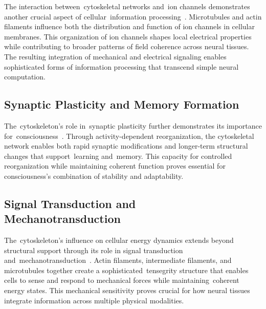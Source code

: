 The interaction between~cytoskeletal networks and~ion channels demonstrates another crucial aspect of cellular~information processing~\cite{pinotsis2023cytoelectric, hunt2024electromagnetic}. Microtubules and actin filaments influence both the distribution and function of ion channels in cellular membranes. This organization of ion channels shapes local electrical properties while contributing to broader patterns of field coherence across neural tissues. The resulting integration of mechanical and electrical signaling enables sophisticated forms of information processing that transcend simple neural computation.

\subsection*{Synaptic Plasticity and Memory Formation~~}

The~cytoskeleton's role in~synaptic plasticity further demonstrates its importance for~consciousness~\cite{Kapitein2015, Choquet2013}. Through activity-dependent reorganization, the cytoskeletal network enables both rapid synaptic modifications and longer-term structural changes that support~learning and~memory. This capacity for controlled reorganization while maintaining coherent function proves essential for consciousness's combination of stability and adaptability.

\subsection*{Signal Transduction and Mechanotransduction~~}

The~cytoskeleton's influence on cellular energy dynamics extends beyond structural support through its role in signal transduction and~mechanotransduction~\cite{Fletcher2010, pinotsis2023cytoelectric}. Actin filaments, intermediate filaments, and microtubules together create a sophisticated~tensegrity structure that enables cells to sense and respond to mechanical forces while maintaining~coherent energy states. This mechanical sensitivity proves crucial for how neural tissues integrate information across multiple physical modalities.

